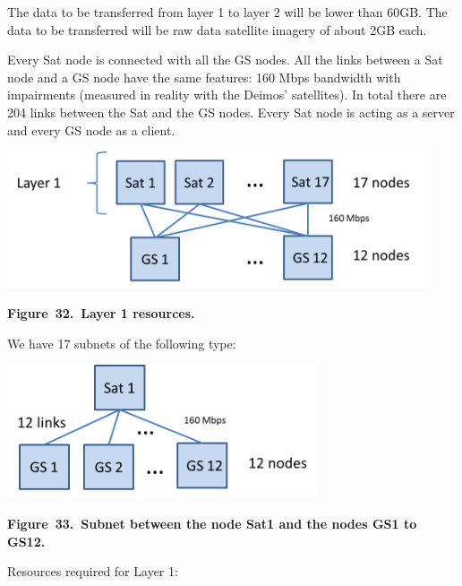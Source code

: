 \documentclass[a4paper]{article}
\begin{document}
\bigskip

The data to be transferred from layer 1 to layer 2 will be lower than
60GB. The data to be transferred will be raw data satellite imagery of
about 2GB each.


\bigskip

Every Sat node is connected with all the GS nodes. All the links between
a Sat node and a GS node have the same features: 160 Mbps bandwidth
with impairments (measured in reality with the Deimos{\textquoteright}
satellites). In total there are 204 links between the Sat and the GS
nodes. Every Sat node is acting as a server and every GS node as a
client.


\bigskip

{\centering 
\includegraphics[width=4.94458in,height=1.5853in]{out-img40.png} \par}

{\centering\bfseries
Figure\ 32.\ Layer 1 resources.
\par}


\bigskip

We have 17 subnets of the following type:


\bigskip


\bigskip

{\centering 
\includegraphics[width=3.6049in,height=1.5545in]{out-img41.png} \par}

{\centering\bfseries
Figure\ 33.\ Subnet between the node Sat1 and the nodes GS1 to GS12.
\par}


\bigskip

Resources required for Layer 1:\ 


\bigskip
\end{document}
